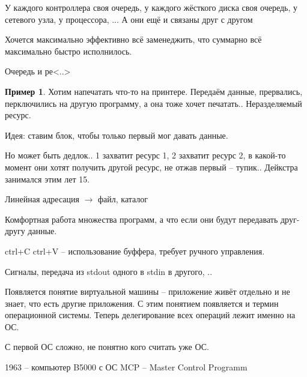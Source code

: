 \documentclass{book}
\theoremstyle{definition}
\newtheorem*{example}{Пример}
\begin{document}
    \begin{problem}

        У каждого контроллера своя очередь, у каждого жёсткого диска своя очередь, у сетевого узла, у процессора, ... А они ещё и связаны друг с другом

        Хочется максимально эффективно всё заменеджить, что суммарно всё максимально быстро исполнилось.

        Очередь и ре<..>

        \begin{example}
            Хотим напечатать что-то на принтере. Передаём данные, прервались, перключились на другую программу, а она тоже хочет печатать.. Неразделяемый ресурс.

            Идея: ставим блок, чтобы только первый мог давать данные.

            Но может быть дедлок.. 1 захватит ресурс 1, 2 захватит ресурс 2, в какой-то момент они хотят получить другой ресурс, не отжав первый -- тупик.. Дейкстра занимался этим лет 15.
        \end{example}
    \end{problem}

    \begin{problem}

        Линейная адресация $\to $ файл, каталог
    \end{problem}
    \begin{problem}

        Комфортная работа множества программ, а что если они будут передавать друг-другу данные.

        ctrl+C ctrl+V -- использование буффера, требует ручного управления.

        Сигналы, передача из stdout одного в stdin в другого, ..

        Появляется понятие виртуальной машины -- приложение живёт отдельно и не знает, что есть другие приложения. С этим понятием появляется и термин операционной системы. Теперь делегирование всех операций лежит именно на ОС.
    \end{problem}

    С первой ОС сложно, не понятно кого считать уже ОС.

    1963 -- компьютер B5000 с ОС MCP -- Master Control Programm
\end{document}
